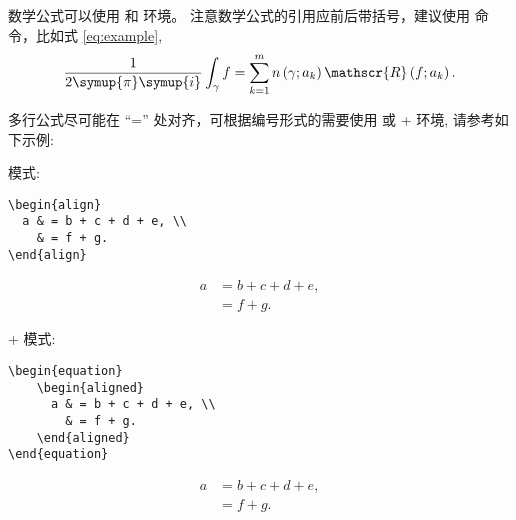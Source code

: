 数学公式可以使用  和  环境。
注意数学公式的引用应前后带括号，建议使用  命令，比如式 \eqref{eq:example},
\begin{equation}
  \frac{1}{2 \symup{\pi} \symup{i}} \int_\gamma f = \sum_{k=1}^m n\left(\gamma; a_k\right) \mathscr{R}\left(f; a_k\right).
  \label{eq:example}
\end{equation}

多行公式尽可能在 ``='' 处对齐，可根据编号形式的需要使用  或 + 环境, 请参考如下示例:

模式: 

\begin{minipage}{.48\textwidth}
    \begin{verbatim}
\begin{align}
  a & = b + c + d + e, \\
    & = f + g.
\end{align}
    \end{verbatim}
\end{minipage}
\begin{minipage}{.48\textwidth}
  \begin{align}\label{eq:align}
    a & = b + c + d + e, \\
      & = f + g.
  \end{align}
\end{minipage}

 +  模式:

\begin{minipage}{.48\textwidth}
    \begin{verbatim}
\begin{equation}
    \begin{aligned}
      a & = b + c + d + e, \\
        & = f + g.
    \end{aligned}
\end{equation}
    \end{verbatim}
\end{minipage}
\begin{minipage}{.48\textwidth}
    \begin{equation}\label{eq:equ_aligned}
        \begin{aligned}
          a & = b + c + d + e, \\
            & = f + g.
        \end{aligned}
    \end{equation}
\end{minipage}

